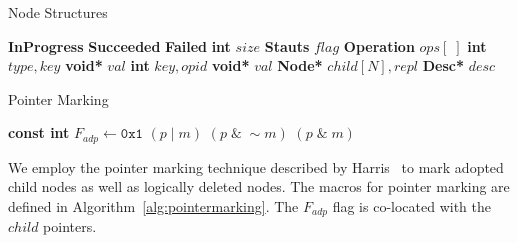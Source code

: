 \documentclass[10pt,conference,compsocconf]{IEEEtran}
\begin{document}
\begin{algorithm}[h]
    \caption{Node Structures}
    \label{alg:nodestructure}
    \vspace{-0.2in}
    \begin{multicols}{2}
        \begin{algorithmic}[1]
            \State \textbf{InProgress}
            \State \textbf{Succeeded}
            \State \textbf{Failed}
            \EndEnum
            \State \textbf{int} $size$
            \State \textbf{Stauts} $flag$
            \State \textbf{Operation} $ops[\;]$
            \EndStruct
            \State \textbf{int} $type,key$
            \State \textbf{void*} $val$
            \EndStruct
            \State \textbf{int} $key,opid$
            \State \textbf{void*} $val$
            \State \textbf{Node*} $child[N],repl$
            \State \textbf{Desc*} $desc$
            \EndStruct
            \end{algorithmic}
    \end{multicols}
    \vspace{-0.15in}
\end{algorithm}

\begin{algorithm}[h]
    \caption{Pointer Marking}
    \label{alg:pointermarking}
    \begin{algorithmic}[1]
        \State \textbf{const int} $F_{adp} \gets \texttt{0x1}$
         $(p\;|\;m)$
        \EndDefine
         $(p\;\&\;\sim m)$
        \EndDefine
         $(p\;\&\;m)$
        \EndDefine
    \end{algorithmic}
\end{algorithm}

We employ the pointer marking technique described by Harris~\cite{harris2001pragmatic} to mark adopted child nodes as well as logically deleted nodes. 
The macros for pointer marking are defined in Algorithm~\ref{alg:pointermarking}.
The $F_{adp}$ flag is co-located with the $child$ pointers.
\end{document}
